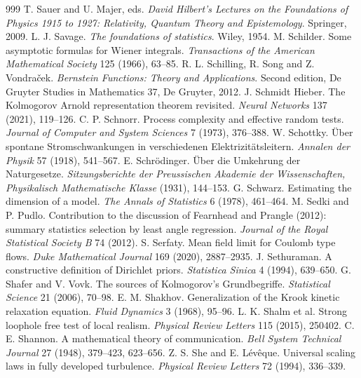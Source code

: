 \begin{thebibliography}{999}
 T. Sauer and U. Majer, eds. \emph{David Hilbert's Lectures on the Foundations of Physics 1915 to 1927: Relativity, Quantum Theory and Epistemology}. Springer, 2009.
 L. J. Savage. \emph{The foundations of statistics}. Wiley, 1954.
 M. Schilder. Some asymptotic formulas for Wiener integrals. \emph{Transactions of the American Mathematical Society} 125 (1966), 63--85.
 R. L. Schilling, R. Song and Z. Vondra\v{c}ek. \emph{Bernstein Functions: Theory and Applications}. Second edition, De Gruyter Studies in Mathematics 37, De Gruyter, 2012.
 J. Schmidt Hieber. The Kolmogorov Arnold representation theorem revisited. \emph{Neural Networks} 137 (2021), 119--126.
 C. P. Schnorr. Process complexity and effective random tests. \emph{Journal of Computer and System Sciences} 7 (1973), 376--388.
 W. Schottky. \"Uber spontane Stromschwankungen in verschiedenen Elektrizit\"atsleitern. \emph{Annalen der Physik} 57 (1918), 541--567.
 E. Schr\"odinger. \"Uber die Umkehrung der Naturgesetze. \emph{Sitzungsberichte der Preussischen Akademie der Wissenschaften, Physikalisch Mathematische Klasse} (1931), 144--153.
 G. Schwarz. Estimating the dimension of a model. \emph{The Annals of Statistics} 6 (1978), 461--464.
 M. Sedki and P. Pudlo. Contribution to the discussion of Fearnhead and Prangle (2012): summary statistics selection by least angle regression. \emph{Journal of the Royal Statistical Society B} 74 (2012).
 S. Serfaty. Mean field limit for Coulomb type flows. \emph{Duke Mathematical Journal} 169 (2020), 2887--2935.
 J. Sethuraman. A constructive definition of Dirichlet priors. \emph{Statistica Sinica} 4 (1994), 639--650.
 G. Shafer and V. Vovk. The sources of Kolmogorov's Grundbegriffe. \emph{Statistical Science} 21 (2006), 70--98.
 E. M. Shakhov. Generalization of the Krook kinetic relaxation equation. \emph{Fluid Dynamics} 3 (1968), 95--96.
 L. K. Shalm et al. Strong loophole free test of local realism. \emph{Physical Review Letters} 115 (2015), 250402.
 C. E. Shannon. A mathematical theory of communication. \emph{Bell System Technical Journal} 27 (1948), 379--423, 623--656.
 Z. S. She and E. L\'ev\^eque. Universal scaling laws in fully developed turbulence. \emph{Physical Review Letters} 72 (1994), 336--339.

\end{thebibliography}
